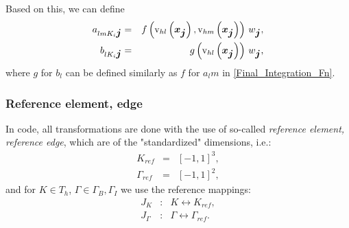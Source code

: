 Based on this, we can define
\begin{eqnarray}
\label{singleNumIntA}
a_{lm K_i \mbox{\boldmath $j$}} & = & f\left(\mathrm{v}_{hl}\left(\mbox{\boldmath $x$}_{\mbox{\boldmath $j$}}\right), \mathrm{v}_{hm}\left(\mbox{\boldmath $x$}_{\mbox{\boldmath $j$}}\right)\right)\,w_{\mbox{\boldmath $j$}},\\
\label{singleNumIntB}
b_{l K_i \mbox{\boldmath $j$}} & = & g\left(\mathrm{v}_{hl}\left(\mbox{\boldmath $x$}_{\mbox{\boldmath $j$}}\right)\right)\,w_{\mbox{\boldmath $j$}},
\end{eqnarray}
where $g$ for $b_l$ can be defined similarly as $f$ for $a_lm$ in \ref{Final_Integration_Fn}.

\subsubsection{Reference element, edge}
In code, all transformations are done with the use of so-called \textit{reference element, reference edge}, which are of the "standardized" dimensions, i.e.:
\begin{eqnarray}
K_{ref} & = & \left[-1, 1\right]^{3},\\
\Gamma_{ref} & = & \left[-1, 1\right]^{2},
\end{eqnarray}
and for $K \in T_h$, $\Gamma \in \Gamma_B, \Gamma_I$ we use the reference mappings:
\begin{eqnarray}
J_K & : & K \leftrightarrow K_{ref},\\
J_\Gamma & : & \Gamma \leftrightarrow \Gamma_{ref}.
\end{eqnarray}


